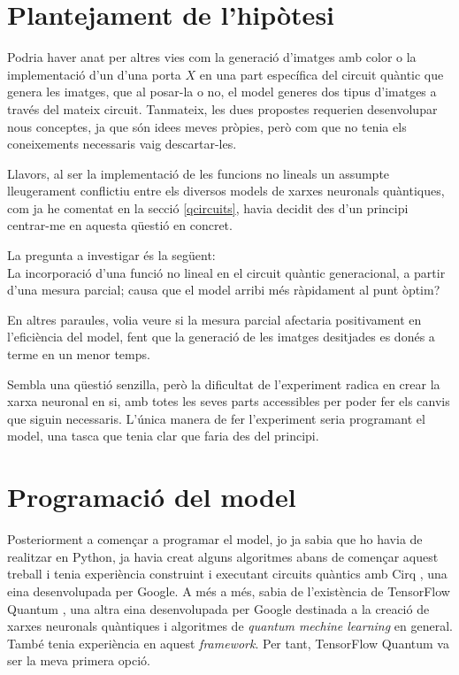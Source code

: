 \chapter{Plantejament de l'hipòtesi}

Podria haver anat per altres vies com la generació d'imatges amb color o la implementació d'un d'una porta $X$ en una part específica del circuit quàntic que genera les imatges, que al posar-la o no, el model generes dos tipus d'imatges a través del mateix circuit. Tanmateix, les dues propostes requerien desenvolupar nous conceptes, ja que són idees meves pròpies, però com que no tenia els coneixements necessaris vaig descartar-les.

Llavors, al ser la implementació de les funcions no lineals un assumpte lleugerament conflictiu entre els diversos models de xarxes neuronals quàntiques, com ja he comentat en la secció \ref{qcircuits}, havia decidit des d'un principi centrar-me en aquesta qüestió en concret.

La pregunta a investigar és la següent: \\
La incorporació d'una funció no lineal en el circuit quàntic generacional, a partir d'una mesura parcial; causa que el model arribi més ràpidament al punt òptim?

En altres paraules, volia veure si la mesura parcial afectaria positivament en l'eficiència del model, fent que la generació de les imatges desitjades es donés a terme en un menor temps.

Sembla una qüestió senzilla, però la dificultat de l'experiment radica en crear la xarxa neuronal en si, amb totes les seves parts accessibles per poder fer els canvis que siguin necessaris. L'única manera de fer l'experiment seria programant el model, una tasca que tenia clar que faria des del principi.

\chapter{Programació del model}

Posteriorment a començar a programar el model, jo ja sabia que ho havia de realitzar en Python, ja havia creat alguns algoritmes abans de començar aquest treball i tenia experiència construint i executant circuits quàntics amb Cirq \cite{cirq}, una eina desenvolupada per Google. A més a més, sabia de l'existència de TensorFlow Quantum \cite{tfq}, una altra eina desenvolupada per Google destinada a la creació de xarxes neuronals quàntiques i algoritmes de \textit{quantum mechine learning} en general. També tenia experiència en aquest \textit{framework}. Per tant, TensorFlow Quantum va ser la meva primera opció. 

